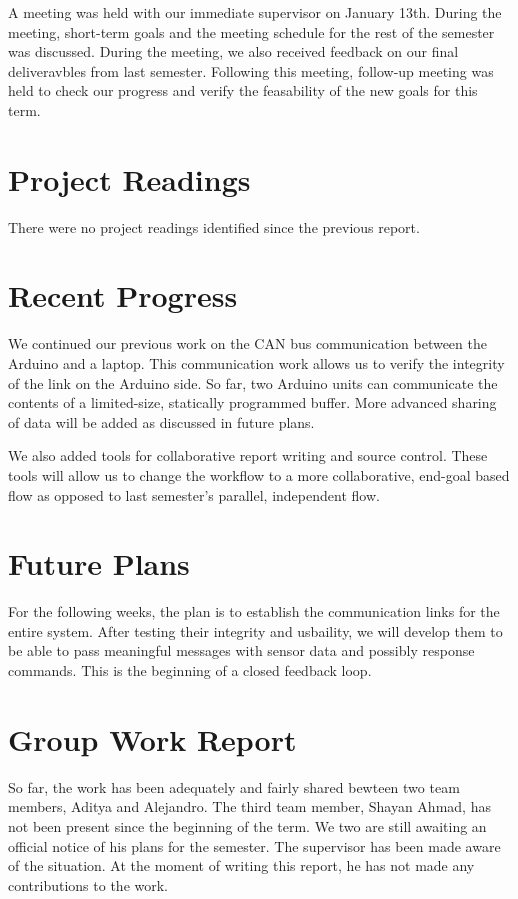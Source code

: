 \documentclass[12pt]{article}
\begin{document}
A meeting was held with our immediate supervisor on January 13th. During the
meeting, short-term goals and the meeting schedule for the rest of the semester
was discussed. During the meeting, we also received feedback on our final 
deliveravbles from last semester. Following this meeting, follow-up meeting was
held to check our progress and verify the feasability of the new goals for 
this term. 

\section*{Project Readings}
There were no project readings identified since the previous report.

\section*{Recent Progress}
We continued our previous work on the CAN bus communication between the Arduino
and a laptop. This communication work allows us to verify the integrity of the 
link on the Arduino side. So far, two Arduino units can communicate the 
contents of a limited-size, statically programmed buffer. More advanced 
sharing of data will be added as discussed in future plans.\newline

We also added tools for collaborative report writing and source control. These
tools will allow us to change the workflow to a more collaborative, end-goal 
based flow as opposed to last semester's parallel, independent flow. 

\section*{Future Plans}
For the following weeks, the plan is to establish the communication links for 
the entire system. After testing their integrity and usbaility, we will 
develop them to be able to pass meaningful messages with sensor data and 
possibly response commands. This is the beginning of a closed feedback loop.

\section*{Group Work Report}
So far, the work has been adequately and fairly shared bewteen two team members,
Aditya and Alejandro. The third team member, Shayan Ahmad, has not been present
since the beginning of the term. We two are still awaiting an official notice
of his plans for the semester. The supervisor has been made aware of the
situation. At the moment of writing this report, he has not made any
contributions to the work.
\end{document}
